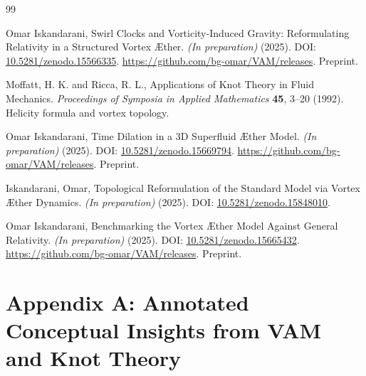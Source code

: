 \documentclass[11pt]{article}
\begin{document}
\begin{thebibliography}{99}

Omar Iskandarani,
\newblock Swirl Clocks and Vorticity-Induced Gravity: Reformulating Relativity in a Structured Vortex Æther.
\textit{(In preparation)} (2025).
\newblock DOI: \href{https://doi.org/10.5281/zenodo.15566335}{10.5281/zenodo.15566335}.
\newblock \url{https://github.com/bg-omar/VAM/releases}.
\newblock Preprint.


Moffatt, H. K. and Ricca, R. L.,
\newblock Applications of Knot Theory in Fluid Mechanics.
\textit{Proceedings of Symposia in Applied Mathematics} \textbf{45}, 3--20 (1992).
\newblock Helicity formula and vortex topology.


Omar Iskandarani,
\newblock Time Dilation in a 3D Superfluid Æther Model.
\textit{(In preparation)} (2025).
\newblock DOI: \href{https://doi.org/10.5281/zenodo.15669794}{10.5281/zenodo.15669794}.
\newblock \url{https://github.com/bg-omar/VAM/releases}.
\newblock Preprint.


Iskandarani, Omar,
\newblock Topological Reformulation of the Standard Model via Vortex Æther Dynamics.
\textit{(In preparation)} (2025).
\newblock DOI: \href{https://doi.org/10.5281/zenodo.15848010}{10.5281/zenodo.15848010}.


Omar Iskandarani,
\newblock Benchmarking the Vortex Æther Model Against General Relativity.
\textit{(In preparation)} (2025).
\newblock DOI: \href{https://doi.org/10.5281/zenodo.15665432}{10.5281/zenodo.15665432}.
\newblock \url{https://github.com/bg-omar/VAM/releases}.
\newblock Preprint.


\end{thebibliography}
\appendix
    \def\standalonechapter{false}
    \newcommand{\appendixtitle}{Appendix A: Annotated Conceptual Insights from VAM and Knot Theory}
\section{\appendixtitle}
\end{document}
